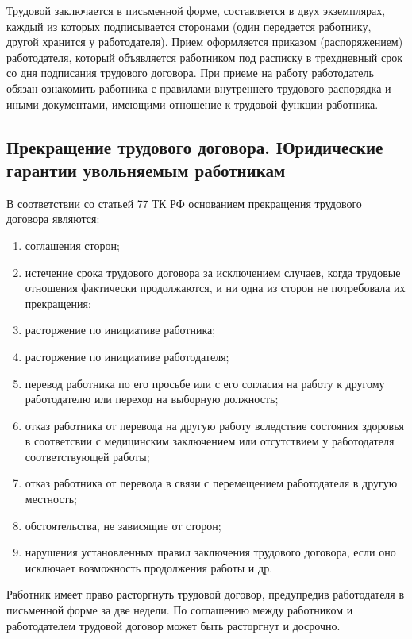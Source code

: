 Трудовой заключается в письменной форме, составляется в двух экземплярах, каждый из которых подписывается сторонами (один передается работнику, другой хранится у работодателя). Прием оформляется приказом (распоряжением) работодателя, который объявляется работником под расписку в трехдневный срок со дня подписания трудового договора. При приеме на работу работодатель обязан ознакомить работника с правилами внутреннего трудового распорядка и иными документами, имеющими отношение к трудовой функции работника. 

\subsection{Прекращение трудового договора. Юридические гарантии увольняемым работникам}

В соответствии со статьей 77 ТК РФ основанием прекращения трудового договора являются:

\begin{enumerate}
	\item соглашения сторон;
	\item истечение срока трудового договора за исключением случаев, когда трудовые отношения фактически продолжаются, и ни одна из сторон не потребовала их прекращения;
	\item расторжение по инициативе работника;
	\item расторжение по инициативе работодателя;
	\item перевод работника по его просьбе или с его согласия на работу к другому работодателю или переход на выборную должность;
	\item отказ работника от перевода на другую работу вследствие состояния здоровья в соответсвии с медицинским заключением или отсутствием у работодателя соответствующей работы;
	\item отказ работника от перевода в связи с перемещением работодателя в другую местность;
	\item обстоятельства, не зависящие от сторон;
	\item нарушения установленных правил заключения трудового договора, если оно исключает возможность продолжения работы и др.
\end{enumerate}

Работник имеет право расторгнуть трудовой договор, предупредив работодателя в письменной форме за две недели. По соглашению между работником и работодателем трудовой договор может быть расторгнут и досрочно.

